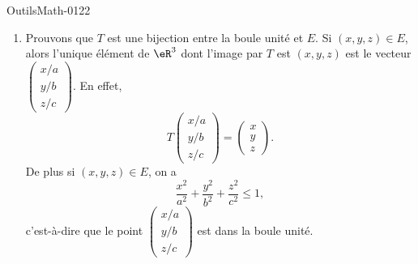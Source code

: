 
\begin{corrige}{OutilsMath-0122}

    \begin{enumerate}
        \item
            Prouvons que \( T\) est une bijection entre la boule unité et \( E\). Si \( (x,y,z)\in E\), alors l'unique élément de \( \eR^3\) dont l'image par \( T\) est \( (x,y,z)\) est le vecteur \( \begin{pmatrix}
                x/a    \\ 
                y/b    \\ 
                z/c    
            \end{pmatrix}\). En effet,
            \begin{equation}
                T\begin{pmatrix}
                    x/a    \\ 
                    y/b    \\ 
                    z/c    
                \end{pmatrix}=\begin{pmatrix}
                    x    \\ 
                    y    \\ 
                    z    
                \end{pmatrix}.
            \end{equation}
            De plus si \( (x,y,z)\in E\), on a 
            \begin{equation}
                \frac{ x^2 }{ a^2 }+\frac{ y^2 }{ b^2 }+\frac{ z^2 }{ c^2 }\leq 1,
            \end{equation}
            c'est-à-dire que le point \( \begin{pmatrix}
                x/a    \\ 
                y/b    \\ 
                z/c    
            \end{pmatrix}\) est dans la boule unité.


\end{enumerate}
\end{corrige}
